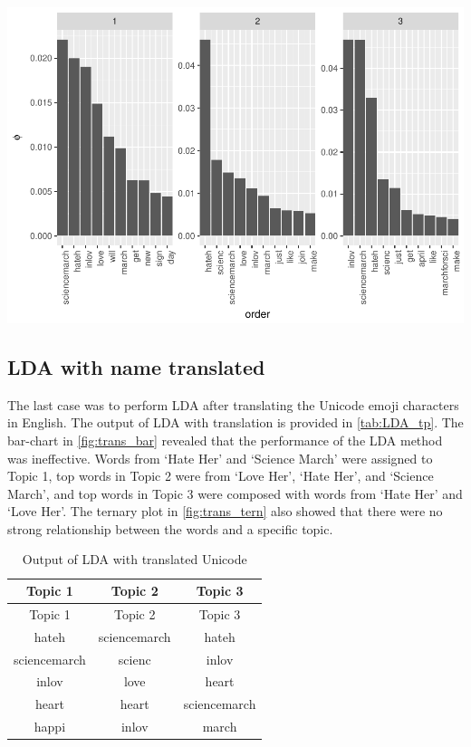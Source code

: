 \documentclass[]{article}
\begin{document}
\includegraphics{CC_paper_files/figure-latex/unnamed-chunk-5-1.pdf}

\subsection{LDA with name translated}\label{lda-with-name-translated}

The last case was to perform LDA after translating the Unicode emoji
characters in English. The output of LDA with translation is provided in
\autoref{tab:LDA_tp}. The bar-chart in \autoref{fig:trans_bar} revealed
that the performance of the LDA method was ineffective. Words from `Hate
Her' and `Science March' were assigned to Topic 1, top words in Topic 2
were from `Love Her', `Hate Her', and `Science March', and top words in
Topic 3 were composed with words from `Hate Her' and `Love Her'. The
ternary plot in \autoref{fig:trans_tern} also showed that there were no
strong relationship between the words and a specific topic.

\begin{longtable}[]{@{}ccc@{}}
\caption{\label{tab:LDA_t} Output of LDA with translated
Unicode}\tabularnewline
\toprule
Topic 1 & Topic 2 & Topic 3\tabularnewline
\midrule
\endfirsthead
\toprule
Topic 1 & Topic 2 & Topic 3\tabularnewline
\midrule
\endhead
hateh & sciencemarch & hateh\tabularnewline
sciencemarch & scienc & inlov\tabularnewline
inlov & love & heart\tabularnewline
heart & heart & sciencemarch\tabularnewline
happi & inlov & march\tabularnewline
\bottomrule
\end{longtable}
\end{document}
